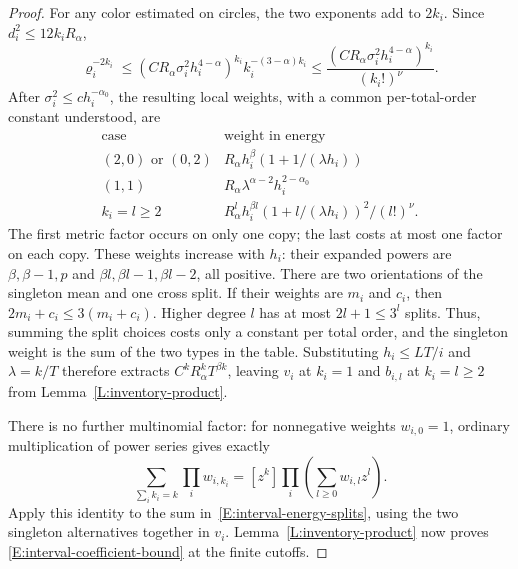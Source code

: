 \documentclass[12pt]{article}
\numberwithin{equation}{section}
\theoremstyle{definition}
\begin{document}
\begin{proof}
  For any color estimated on circles, the two exponents add to $2k_i$.
  Since $d_i^2\le12k_iR_\alpha$,
  \[
    \varrho_i^{-2k_i}
    \le(CR_\alpha\sigma_i^2h_i^{4-\alpha})^{k_i}
    k_i^{-(3-\alpha)k_i}
    \le\frac{(CR_\alpha\sigma_i^2h_i^{4-\alpha})^{k_i}}
    {(k_i!)^\nu}.
  \]
  After $\sigma_i^2\le c h_i^{-\alpha_0}$, the resulting local weights,
  with a common per-total-order constant understood, are
  \[
    \begin{array}{c|c}
      \text{case}&\text{weight in energy}\\ \hline
      (2,0)\text{ or }(0,2)&R_\alpha h_i^\beta
      (1+1/(\lambda h_i))\\
      (1,1)&R_\alpha\lambda^{\alpha-2}h_i^{2-\alpha_0}\\
      k_i=l\ge2&R_\alpha^l h_i^{\beta l}
      (1+l/(\lambda h_i))^2/(l!)^\nu .
    \end{array}
  \]
  The first metric factor occurs on only one copy; the last costs at
  most one factor on each copy. These weights increase with $h_i$:
  their expanded powers are $\beta,\beta-1,p$ and
  $\beta l,\beta l-1,\beta l-2$, all positive.
  There are two orientations of the singleton mean and one cross split.
  If their weights are $m_i$ and $c_i$, then
  $2m_i+c_i\le3(m_i+c_i)$.
  Higher degree $l$ has at most $2l+1\le3^l$ splits.
  Thus, summing the split choices costs only a constant per total order,
  and the singleton weight is the sum of the two types in the table.
  Substituting $h_i\le LT/i$ and $\lambda=k/T$ therefore extracts
  $C^kR_\alpha^kT^{\beta k}$, leaving $v_i$ at $k_i=1$ and
  $b_{i,l}$ at $k_i=l\ge2$ from Lemma~\ref{L:inventory-product}.

  There is no further multinomial factor: for nonnegative weights
  $w_{i,0}=1$, ordinary multiplication of power series gives exactly
  \[
    \sum_{\sum_i k_i=k}\prod_i w_{i,k_i}
    =[z^k]\prod_i\left(\sum_{l\ge0}w_{i,l}z^l\right).
  \]
  Apply this identity to the sum in~\eqref{E:interval-energy-splits},
  using the two singleton alternatives together in $v_i$.
  Lemma~\ref{L:inventory-product} now proves
  \eqref{E:interval-coefficient-bound} at the finite cutoffs.


\end{proof}
\end{document}
